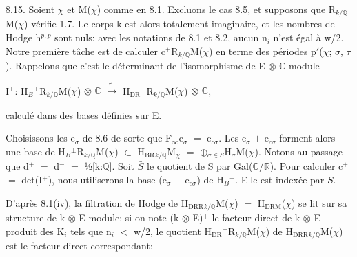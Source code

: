 \documentclass[10pt,twoside]{article}
\begin{document}
8.15. Soient \ensuremath{χ} et M(\ensuremath{χ}) comme en 8.1. Excluons le cas 8.5, et supposons que R\ensuremath{_{k/ℚ}}M(\ensuremath{χ}) vérifie 1.7. Le corps k est alors totalement imaginaire, et les nombres de Hodge h\ensuremath{^{p,p}} sont nuls: avec les notations de 8.1 et 8.2, aucun n\ensuremath{_{i}} n’est égal à w/2. Notre première tâche est de calculer c\ensuremath{^{+}}R\ensuremath{_{k/ℚ}}M(\ensuremath{χ}) en terme des périodes p\ensuremath{′}(\ensuremath{χ}; \ensuremath{σ}, \ensuremath{τ}). Rappelons que c’est le déterminant de l’isomorphisme de E \ensuremath{⊗} \ensuremath{ℂ}-module\par
I\ensuremath{^{+}}: H\ensuremath{_{B}}\ensuremath{^{+}}R\ensuremath{_{k/ℚ}}M(\ensuremath{χ}) \ensuremath{⊗} \ensuremath{ℂ}  \ensuremath{\widetilde{→}}  H\ensuremath{_{\mathrm{DR}}}\ensuremath{^{+}}R\ensuremath{_{k/ℚ}}M(\ensuremath{χ}) \ensuremath{⊗} \ensuremath{ℂ},\par
calculé dans des bases définies sur E.\par
Choisissons les e\ensuremath{_{σ}} de 8.6 de sorte que F\ensuremath{_{∞}}e\ensuremath{_{σ}} \ensuremath{=} e\ensuremath{_{cσ}}. Les e\ensuremath{_{σ}} \ensuremath{±} e\ensuremath{_{cσ}} forment alors une base de H\ensuremath{_{B}}\ensuremath{^{±}}R\ensuremath{_{k/ℚ}}M(\ensuremath{χ}) \ensuremath{⊂} H\ensuremath{_{\mathrm{BR}}}\ensuremath{_{k/ℚ}}M\ensuremath{_{χ}} \ensuremath{=} \ensuremath{⊕}\ensuremath{_{σ∈S}}H\ensuremath{_{σ}}M(\ensuremath{χ}). Notons au passage que d\ensuremath{^{+}} \ensuremath{=} d\ensuremath{^{-}} \ensuremath{=} ½[k:\ensuremath{ℚ}]. Soit \ensuremath{\bar{S}} le quotient de S par Gal(\ensuremath{ℂ}/\ensuremath{ℝ}). Pour calculer c\ensuremath{^{+}} \ensuremath{=} det(I\ensuremath{^{+}}), nous utiliserons la base (e\ensuremath{_{σ}} \ensuremath{+} e\ensuremath{_{cσ}}) de H\ensuremath{_{B}}\ensuremath{^{+}}. Elle est indexée par \ensuremath{\bar{S}}.\par
D’après 8.1(iv), la filtration de Hodge de H\ensuremath{_{\mathrm{DRR}}}\ensuremath{_{k/ℚ}}M(\ensuremath{χ}) \ensuremath{=} H\ensuremath{_{\mathrm{DRM}}}(\ensuremath{χ}) se lit sur sa structure de k \ensuremath{⊗} E-module: si on note (k \ensuremath{⊗} E)\ensuremath{^{+}} le facteur direct de k \ensuremath{⊗} E produit des K\ensuremath{_{i}} tels que n\ensuremath{_{i}} \ensuremath{<} w/2, le quotient H\ensuremath{_{\mathrm{DR}}}\ensuremath{^{+}}R\ensuremath{_{k/ℚ}}M(\ensuremath{χ}) de H\ensuremath{_{\mathrm{DRR}}}\ensuremath{_{k/ℚ}}M(\ensuremath{χ}) est le facteur direct correspondant:\par
\end{document}
